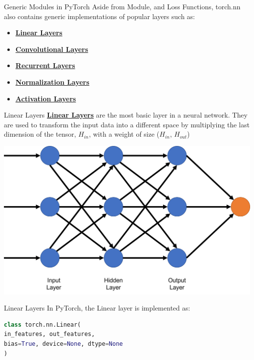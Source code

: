 \documentclass{beamer}
\begin{document}
\begin{frame}[fragile]{Generic Modules in PyTorch}
    Aside from {Module}, and {Loss Functions}, {torch.nn} also contains generic implementations of popular layers such as:
    \begin{itemize}
        \item \href{https://pytorch.org/docs/stable/nn.html#linear-layers}{\textbf{Linear Layers}}
        \item \href{https://pytorch.org/docs/stable/nn.html#convolution-layers}{\textbf{Convolutional Layers}}
        \item \href{https://pytorch.org/docs/stable/nn.html#recurrent-layers}{\textbf{Recurrent Layers}}
        \item \href{https://pytorch.org/docs/stable/nn.html#normalization-layers}{\textbf{Normalization Layers}}
        \item \href{https://pytorch.org/docs/stable/nn.html#non-linear-activations-weighted-sum-nonlinearity}{\textbf{Activation Layers}}
    \end{itemize}
\end{frame}

\begin{frame}[fragile]{Linear Layers}
    \href{https://pytorch.org/docs/stable/nn.html#linear-layers}{\textbf{Linear Layers}} are the most basic layer in a neural network. They are used to transform the input data into a different space by multiplying the last dimension of the tensor, $H_{in}$, with a weight of size ($H_{in}$, $H_{out}$)
    \begin{center}
        \includegraphics[width=\textwidth,height=0.7\textheight,keepaspectratio]{figures/SimpleNN.png}
    \end{center}
\end{frame}
\begin{frame}[fragile]{Linear Layers}
    In PyTorch, the {Linear} layer is implemented as:
    \begin{exampleblock}{}
        \begin{lstlisting}[language=Python]
class torch.nn.Linear(
in_features, out_features,
bias=True, device=None, dtype=None
)
        \end{lstlisting}
    \end{exampleblock}
\end{frame}
\end{document}
